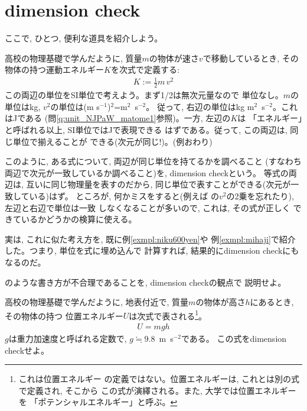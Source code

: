 \section{dimension check}
ここで, ひとつ, 便利な道具を紹介しよう。

\begin{exmpl}
高校の物理基礎で学んだように, 質量$m$の物体が速さ$v$で移動しているとき, 
その物体の持つ運動エネルギー$K$を次式で定義する:
\begin{eqnarray}
K:=\frac{1}{2}m\,v^2\label{eq:def_kinenergy}
\end{eqnarray}
この両辺の単位をSI単位で考えよう。まず1/2は無次元量なので
単位なし。$m$の単位はkg, $v^2$の単位は(m s$^{-1}$)$^2$=m$^2$~s$^{-2}$。
従って, 右辺の単位はkg m$^2$~s$^{-2}$。これはJである
(問\ref{q:unit_NJPaW_matome1}参照)。一方, 左辺の$K$は
「エネルギー」と呼ばれる以上, SI単位ではJで表現できる
はずである。従って, この両辺は, 同じ単位で揃えることが
できる(次元が同じ!)。(例おわり)\end{exmpl}

このように, ある式について, 両辺が同じ単位を持てるかを調べること
(すなわち両辺で次元が一致しているか調べること)を, 
dimension checkという。
等式の両辺は, 互いに同じ物理量を表すのだから, 
同じ単位で表すことができる(次元が一致している)はず。
ところが, 何かミスをすると(例えば
の$v^2$の2乗を忘れたり), 左辺と右辺で単位は一致
しなくなることが多いので, これは, その式が正しく
できているかどうかの検算に使える。

実は, これに似た考え方を, 既に例\ref{exmpl:niku600yen}や
例\ref{exmpl:mihaji}で紹介した。つまり, 単位を式に埋め込んで
計算すれば, 結果的にdimension checkにもなるのだ。\mv

\begin{q}\label{q:unit_dimcheck} 
のような書き方が不合理であることを, dimension checkの観点で
説明せよ。\end{q}

\begin{q}\label{q:potentialE_dim} 高校の物理基礎で学んだように, 
地表付近で, 質量$m$の物体が高さ$h$にあるとき, その物体の持つ
位置エネルギー$U$は次式で表される\footnote{これは位置エネルギー
の定義ではない。位置エネルギーは, これとは別の式で定義され, そこから
この式が演繹される。また, 大学では位置エネルギーを
「ポテンシャルエネルギー」と呼ぶ。}。
\begin{eqnarray}
U=mgh
\end{eqnarray}
$g$は重力加速度と呼ばれる定数で, $g\fallingdotseq9.8$~m~s$^{-2}$である。
この式をdimension checkせよ。
\end{q}

